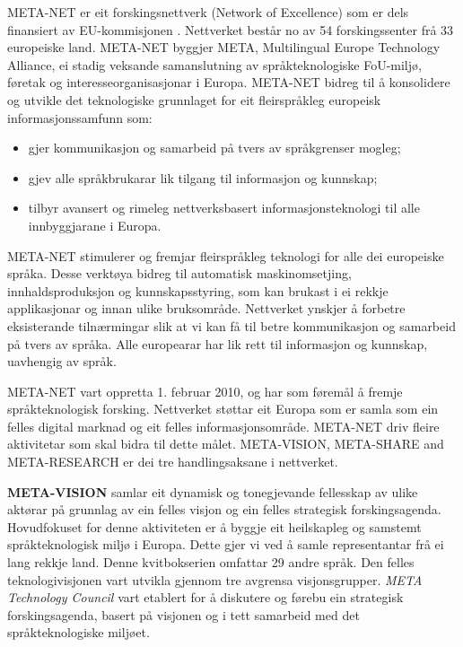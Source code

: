 \begin{multicols}{2}

META-NET er eit forskingsnettverk (Network of Excellence) som er dels finansiert av EU-kommisjonen \cite{rehm2011}. Nettverket består no av 54 forskingssenter frå 33 europeiske land. META-NET byggjer META, Multilingual Europe Technology Alliance, ei stadig veksande samanslutning av språkteknologiske FoU-miljø, føretak og interesseorganisasjonar i Europa.
META-NET bidreg til å konsolidere og utvikle det teknologiske grunnlaget for eit fleirspråkleg europeisk informasjonssamfunn som:

\begin{itemize}
\item gjer kommunikasjon og samarbeid på tvers av språkgrenser mogleg;
\item gjev alle språkbrukarar lik tilgang til informasjon og kunnskap;
\item tilbyr avansert og rimeleg nettverksbasert informasjonsteknologi til alle innbyggjarane i Europa.
\end{itemize}

META-NET stimulerer og fremjar fleirspråkleg teknologi for alle dei europeiske språka. Desse verktøya bidreg til automatisk maskinomsetjing, innhaldsproduksjon og kunnskapsstyring, som kan brukast i ei rekkje applikasjonar og innan ulike bruksområde. Nettverket ynskjer å forbetre eksisterande tilnærmingar slik at vi kan få til betre kommunikasjon og samarbeid på tvers av språka. Alle europearar har lik rett til informasjon og kunnskap, uavhengig av språk.

META-NET vart oppretta 1. februar 2010, og har som føremål å fremje språkteknologisk forsking. Nettverket støttar eit Europa som er samla som ein felles digital marknad og eit felles informasjonsområde. META-NET driv fleire aktivitetar som skal bidra til dette målet. META-VISION, META-SHARE and META-RESEARCH er dei tre handlingsaksane i nettverket. 

\textbf{META-VISION} samlar eit dynamisk og tonegjevande fellesskap av ulike aktørar på grunnlag av ein felles visjon og ein felles strategisk forskingsagenda. Hovudfokuset for denne aktiviteten er å byggje eit heilskapleg og samstemt språkteknologisk miljø i Europa. Dette gjer vi ved å samle representantar frå ei lang rekkje land. Denne kvitbokserien omfattar 29 andre språk. Den felles teknologivisjonen vart utvikla gjennom tre avgrensa visjonsgrupper. \textit{META Technology Council} vart etablert for å diskutere og førebu ein strategisk forskingsagenda, basert på visjonen og i tett samarbeid med det språkteknologiske miljøet.


\end{multicols}
